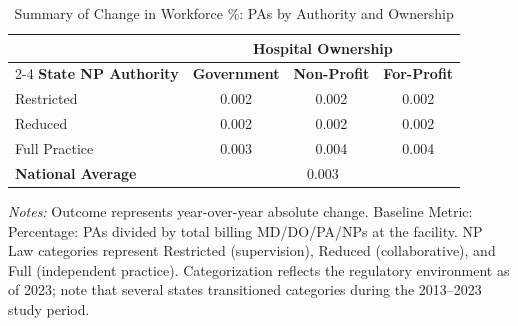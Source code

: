 \begin{table}[htbp]
    \centering
    \caption{Summary of Change in Workforce \%: PAs by Authority and Ownership}
    \label{tab:d_pct_pa}
    \vspace{0.2cm}
    \begin{tabular}{lccc}
        \toprule
        & \multicolumn{3}{c}{\textbf{Hospital Ownership}} \\
        \cmidrule(lr){2-4}
        \textbf{State NP Authority} & \textbf{Government} & \textbf{Non-Profit} & \textbf{For-Profit} \\
        \midrule
        Restricted & 0.002 & 0.002 & 0.002 \\
        Reduced & 0.002 & 0.002 & 0.002 \\
        Full Practice & 0.003 & 0.004 & 0.004 \\
        \midrule
        \textbf{National Average} & \multicolumn{3}{c}{0.003} \\
        \bottomrule
    \end{tabular}
    \vspace{0.1cm}
    \begin{minipage}{0.85\textwidth}
        \footnotesize \textit{Notes:} Outcome represents year-over-year absolute change. Baseline Metric: Percentage: PAs divided by total billing MD/DO/PA/NPs at the facility. NP Law categories represent Restricted (supervision), Reduced (collaborative), and Full (independent practice). Categorization reflects the regulatory environment as of 2023; note that several states transitioned categories during the 2013--2023 study period.
    \end{minipage}
\end{table}